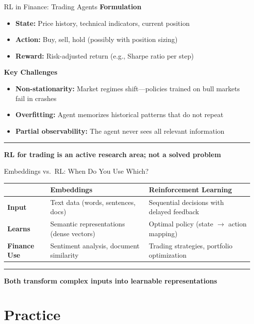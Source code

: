 \documentclass[8pt,aspectratio=169]{beamer}
\newcommand{\bottomnote}[1]{%
\vfill
\vspace{-2mm}
\textcolor{mllavender2}{\rule{\textwidth}{0.4pt}}
\vspace{1mm}
\footnotesize
\textbf{#1}
}
\begin{document}
\begin{frame}[t]{RL in Finance: Trading Agents}
\textbf{Formulation}
\begin{itemize}
\item \textbf{State:} Price history, technical indicators, current position
\item \textbf{Action:} Buy, sell, hold (possibly with position sizing)
\item \textbf{Reward:} Risk-adjusted return (e.g., Sharpe ratio per step)
\end{itemize}
\vspace{0.3em}
\textbf{Key Challenges}
\begin{itemize}
\item \textbf{Non-stationarity:} Market regimes shift---policies trained on bull markets fail in crashes
\item \textbf{Overfitting:} Agent memorizes historical patterns that do not repeat
\item \textbf{Partial observability:} The agent never sees all relevant information
\end{itemize}
\bottomnote{RL for trading is an active research area; not a solved problem}
\end{frame}

\begin{frame}[t]{Embeddings vs.\ RL: When Do You Use Which?}
\begin{center}
\renewcommand{\arraystretch}{1.4}
\begin{tabular}{lll}
\toprule
 & \textbf{Embeddings} & \textbf{Reinforcement Learning} \\
\midrule
\textbf{Input} & Text data (words, sentences, docs) & Sequential decisions with delayed feedback \\
\textbf{Learns} & Semantic representations (dense vectors) & Optimal policy (state $\to$ action mapping) \\
\textbf{Finance Use} & Sentiment analysis, document similarity & Trading strategies, portfolio optimization \\
\bottomrule
\end{tabular}
\end{center}
\bottomnote{Both transform complex inputs into learnable representations}
\end{frame}

\section{Practice}
\end{document}
